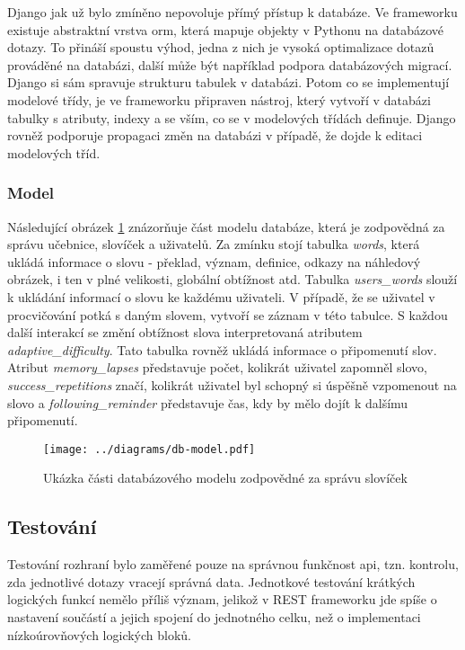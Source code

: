 \documentclass[a4paper,11pt,titlepage,fleqn]{article}
\begin{document}
        Django jak už bylo zmíněno nepovoluje přímý přístup k databáze. Ve frameworku existuje abstraktní vrstva \gls{orm}, která mapuje objekty v Pythonu na databázové dotazy. To přináší spoustu výhod, jedna z nich je vysoká optimalizace dotazů prováděné na databázi, další může být například podpora databázových migrací. Django si sám spravuje strukturu tabulek v databázi. Potom co se implementují modelové třídy, je ve frameworku připraven nástroj, který vytvoří v databázi tabulky s atributy, indexy a se vším, co se v modelových třídách definuje. Django rovněž podporuje propagaci změn na databázi v případě, že dojde k editaci modelových tříd\cite{bib:django}.

        \subsubsection{Model}

        Následující obrázek \ref{fig:db-model} znázorňuje část modelu databáze, která je zodpovědná za správu učebnice, slovíček a uživatelů. Za zmínku stojí tabulka \textit{words}, která ukládá informace o slovu - překlad, význam, definice, odkazy na náhledový obrázek, i ten v plné velikosti, globální obtížnost atd. Tabulka \textit{users\_words} slouží k ukládání informací o slovu ke každému uživateli. V případě, že se uživatel v procvičování potká s daným slovem, vytvoří se záznam v této tabulce. S každou další interakcí se změní obtížnost slova interpretovaná atributem \textit{adaptive\_difficulty}. Tato tabulka rovněž ukládá informace o připomenutí slov. Atribut \textit{memory\_lapses} představuje počet, kolikrát uživatel zapomněl slovo, \textit{success\_repetitions} značí, kolikrát uživatel byl schopný si úspěšně vzpomenout na slovo a \textit{following\_reminder} představuje čas, kdy by mělo dojít k dalšímu připomenutí.

        \begin{figure}[ht!]
            \centering
            \texttt{[image: ../diagrams/db-model.pdf]}
            \caption{Ukázka části databázového modelu zodpovědné za správu slovíček}
            \label{fig:db-model}
        \end{figure}

    \subsection{Testování}
        Testování rozhraní bylo zaměřené pouze na správnou funkčnost \gls{api}, tzn. kontrolu, zda jednotlivé dotazy vracejí správná data. Jednotkové testování krátkých logických funkcí nemělo příliš význam, jelikož v REST frameworku jde spíše o nastavení součástí a jejich spojení do jednotného celku, než o implementaci nízkoúrovňových logických bloků.
        
\end{document}
